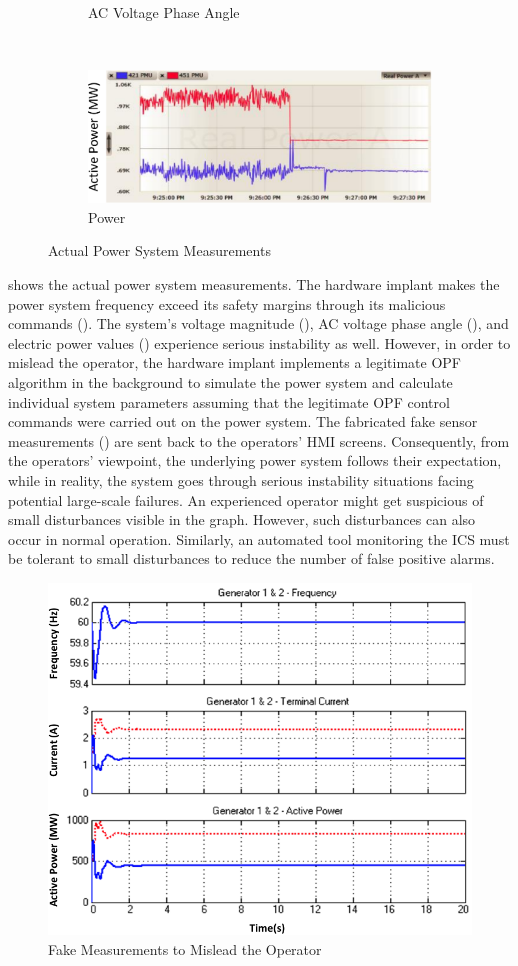 \begin{figure}[tp]
\begin{subfigure}[b]{0.42\textwidth}
        \caption{AC Voltage Phase Angle}
		\label{fig:attack2-3}
	\end{subfigure}
~ \qquad
	\begin{subfigure}[b]{0.42\textwidth}
    	\centering
	\includegraphics[width=1\textwidth]{figures/attack2-5}
        \vspace{-0.15in}
        \caption{Power}
		\label{fig:attack2-5}
	\end{subfigure}
    \vspace{-0.15in}
	\caption{Actual Power System Measurements}
    \vspace{-0.15in}
    \label{fig:attack2}
\end{figure}

 shows the actual power system measurements. The hardware implant makes the power system frequency exceed its safety margins through its malicious commands (). The system's voltage magnitude (), AC voltage phase angle (), and electric power values () experience serious instability as well. However, in order to mislead the operator, the hardware implant implements a legitimate OPF algorithm in the background to simulate the power system and calculate individual system parameters assuming that the legitimate OPF control commands were carried out on the power system. The fabricated fake sensor measurements () are sent back to the operators' HMI screens. Consequently, from the operators' viewpoint, the underlying power system follows their expectation, while in reality, the system goes through serious instability situations facing potential large-scale failures.
An experienced operator might get suspicious of small disturbances visible in the graph.
However, such disturbances can also occur in normal operation.
Similarly, an automated tool monitoring the ICS must be tolerant to small disturbances to reduce the number of false positive alarms.

\begin{figure}[tp]
  \centering
  \includegraphics[width=.47\textwidth]{figures/attack2-fake}
  \caption{Fake Measurements to Mislead the Operator}
  \vspace{-0.3in}
  \label{fig:attack2-fake}
\end{figure}



